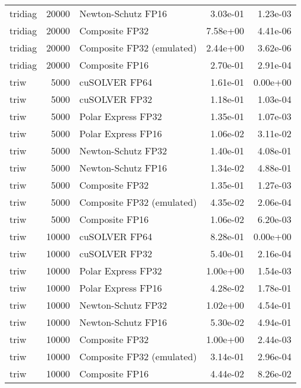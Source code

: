 \begin{table}
\begin{tabular}{lrlrr}
  tridiag & 20000 &        Newton-Schutz FP16 &  3.03e-01 &        1.23e-03 \\
  tridiag & 20000 &            Composite FP32 &  7.58e+00 &        4.41e-06 \\
  tridiag & 20000 & Composite FP32 (emulated) &  2.44e+00 &        3.62e-06 \\
  tridiag & 20000 &            Composite FP16 &  2.70e-01 &        2.91e-04 \\
     triw &  5000 &             cuSOLVER FP64 &  1.61e-01 &        0.00e+00 \\
     triw &  5000 &             cuSOLVER FP32 &  1.18e-01 &        1.03e-04 \\
     triw &  5000 &        Polar Express FP32 &  1.35e-01 &        1.07e-03 \\
     triw &  5000 &        Polar Express FP16 &  1.06e-02 &        3.11e-02 \\
     triw &  5000 &        Newton-Schutz FP32 &  1.40e-01 &        4.08e-01 \\
     triw &  5000 &        Newton-Schutz FP16 &  1.34e-02 &        4.88e-01 \\
     triw &  5000 &            Composite FP32 &  1.35e-01 &        1.27e-03 \\
     triw &  5000 & Composite FP32 (emulated) &  4.35e-02 &        2.06e-04 \\
     triw &  5000 &            Composite FP16 &  1.06e-02 &        6.20e-03 \\
     triw & 10000 &             cuSOLVER FP64 &  8.28e-01 &        0.00e+00 \\
     triw & 10000 &             cuSOLVER FP32 &  5.40e-01 &        2.16e-04 \\
     triw & 10000 &        Polar Express FP32 &  1.00e+00 &        1.54e-03 \\
     triw & 10000 &        Polar Express FP16 &  4.28e-02 &        1.78e-01 \\
     triw & 10000 &        Newton-Schutz FP32 &  1.02e+00 &        4.54e-01 \\
     triw & 10000 &        Newton-Schutz FP16 &  5.30e-02 &        4.94e-01 \\
     triw & 10000 &            Composite FP32 &  1.00e+00 &        2.44e-03 \\
     triw & 10000 & Composite FP32 (emulated) &  3.14e-01 &        2.96e-04 \\
     triw & 10000 &            Composite FP16 &  4.44e-02 &        8.26e-02 \\

\end{tabular}
\end{table}
